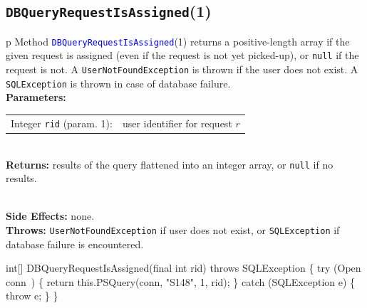 \subsection{\texttt{DBQueryRequestIsAssigned}(1)}
\begin{tabular}{p{\textwidth}}
\toprule
{}
Method \textcolor{blue}{{\tt{}\protect{}DBQueryRequestIsAssigned}}(1) returns a
positive-length array if the given request is assigned (even if the request is
not yet picked-up), or {\tt{}null} if the request is not.  A
{\tt{}UserNotFoundException} is thrown if the user does not exist.
A {\tt{}SQLException} is thrown in case of database failure.\\
\midrule
\textbf{Parameters:} \\
\begin{tabular}{lp{116mm}}
Integer {\tt{}rid} (param. 1):&user identifier for request $r$
\end{tabular}\\
\textbf{Returns:} results of the query flattened into an integer array, or
{\tt{}null} if no results.

\\
\textbf{Side Effects:} none.\\
\textbf{Throws:} {\tt{}UserNotFoundException} if user does not exist, or
{\tt{}SQLException} if database failure is encountered.\\
\bottomrule
\end{tabular}
\nwenddocs{}\endmoddef{}
int[] DBQueryRequestIsAssigned(final int rid) throws SQLException \{
  try (\LA{}Open \code{}conn\edoc{}~{\nwtagstyle{}}\RA{}) \{
    return this.PSQuery(conn, "S148", 1, rid);
  \} catch (SQLException e) \{
    throw e;
  \}
\}
\eatline
{}\nwendcode{}\nwdocspar
